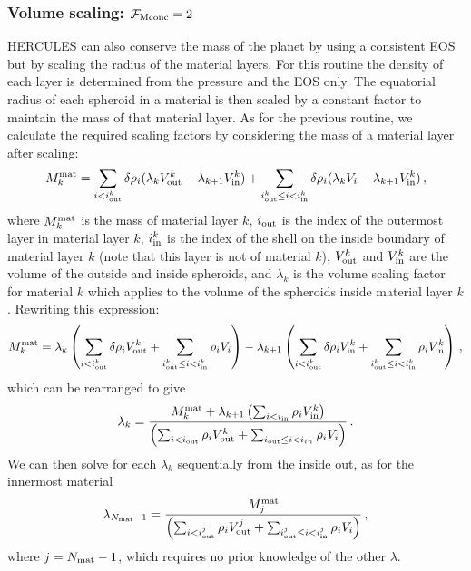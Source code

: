 \documentclass[11pt, oneside]{article}   	%
\begin{document}
\subsubsection{Volume scaling: $\mathcal{F_{\rm Mconc}}=2$}

HERCULES can also conserve the mass of the planet by using a consistent EOS but by scaling the radius of the material layers. 
For this routine the density of each layer is determined from the pressure and the EOS only.
The equatorial radius of each spheroid in a material is then scaled by a constant factor to maintain the mass of that material layer.
As for the previous routine, we calculate the required scaling factors by considering the mass of a material layer after scaling:
%
\begin{align}
\begin{aligned}
M_{k}^{\rm mat} =\sum_{i<i_{\rm out}^k} \delta\rho_i(\lambda_k V_{\rm out}^k -\lambda_{k+1} V_{\rm in}^k) +\sum_{i_{\rm out}^k\le i<i_{\rm in}^k} \delta \rho_i(\lambda_k V_{i} -\lambda_{k+1} V_{\rm in}^k) \, ,
\end{aligned}
\end{align}
%
where $M_k^{\rm mat}$ is the mass of material layer $k$, $i_{\rm out}$ is the index of the outermost layer in material layer $k$, $i_{\rm in}^k$ is the index of the shell on the inside boundary of material layer $k$ (note that this layer is not of  material $k$), $V_{\rm out}^k$ and $V_{\rm in}^k$ are the volume of the outside and inside spheroids, and $\lambda_k$ is the volume scaling factor for material $k$ which applies to the volume of the spheroids inside material layer $k$. 
Rewriting this expression:
%
\begin{align}
\begin{aligned}
M_{k}^{\rm mat} = \lambda_k \left ( \sum_{i<i_{\rm out}^k} \delta\rho_i  V_{\rm out}^k +\sum_{i_{\rm out}^k\le i<i_{\rm in}^k} \rho_i V_{i}\right )  -\lambda_{k+1} \left ( \sum_{i<i_{\rm out}^k} \delta\rho_i V_{\rm in}^k +\sum_{i_{\rm out}^k\le i<i_{\rm in}^k} \rho_i V_{\rm in}^k \right ) \, ,
\end{aligned}
\end{align}
%
which can be rearranged to give
%
\begin{align}
\begin{aligned}
 \lambda_k = \frac{ M_{k}^{\rm mat}+ \lambda_{k+1} \left ( \sum_{i<i_{\rm in}} \rho_i V_{\rm in}^k  \right )}{ \left ( \sum_{i<i_{\rm out}} \rho_i  V_{\rm out}^k +\sum_{i_{\rm out}\le i<i_{in}} \rho_i V_{i}\right ) } \, .
\end{aligned}
\end{align}
%
We can then solve for each $\lambda_{k}$ sequentially from the inside out, as for the innermost material
%
\begin{align}
\begin{aligned}
 \lambda_{N_{\rm mat}-1}= \frac{ M_j^{\rm mat}}{ \left ( \sum_{i<i_{\rm out}^{j}} \rho_i  V_{\rm out}^{j} +\sum_{i_{\rm out}^j\le i<i_{\rm in}^j} \rho_i V_{i}\right ) } \,,
\end{aligned}
\end{align}
%
where $j=N_{\rm mat}-1$, which requires no prior knowledge of the other $\lambda$.
\end{document}
